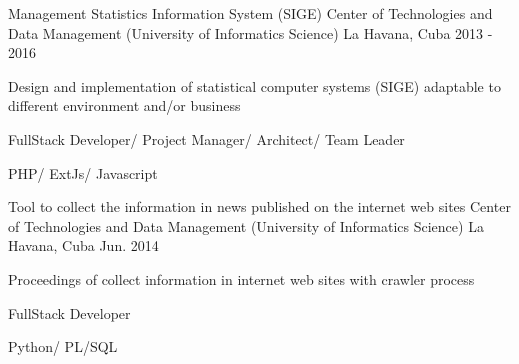 \begin{cventries}

\cventry
{Management Statistics Information System (SIGE)} %
{Center of Technologies and Data Management (University of Informatics Science)} %
{La Havana, Cuba} %
{2013 - 2016} %
{ %
\begin{cvitems}
\item {Design and implementation of statistical computer systems (SIGE) adaptable to different environment and/or business}
\item {FullStack Developer/ Project Manager/ Architect/ Team Leader}
\item {PHP/ ExtJs/ Javascript}
\end{cvitems}
}


\cventry
{Tool to collect the information in news published on the internet web sites} %
{Center of Technologies and Data Management (University of Informatics Science)} %
{La Havana, Cuba} %
{Jun. 2014} %
{ %
\begin{cvitems}
\item {Proceedings of collect information in internet web sites with crawler process}
\item {FullStack Developer}
\item {Python/ PL/SQL}
\end{cvitems}
}


\end{cventries}

